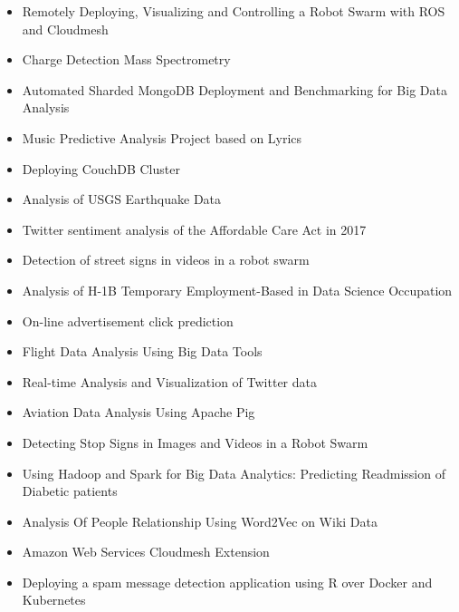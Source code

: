 \documentclass[sigconf]{acmart}
\begin{document}
\begin{itemize}

\item Remotely Deploying, Visualizing and Controlling a Robot Swarm with ROS
and Cloudmesh 

\item Charge Detection Mass Spectrometry

\item Automated Sharded MongoDB Deployment and Benchmarking for Big Data Analysis

\item Music Predictive Analysis Project based on Lyrics

\item Deploying CouchDB Cluster

\item Analysis of USGS Earthquake Data

\item Twitter sentiment analysis of the Affordable Care Act in 2017

\item Detection of street signs in videos in a robot swarm 

\item Analysis of H-1B Temporary Employment-Based in Data Science Occupation

\item On-line advertisement click prediction

\item Flight Data Analysis Using Big Data Tools

\item Real-time Analysis and Visualization of Twitter data

\item Aviation Data Analysis Using Apache Pig

\item Detecting Stop Signs in Images and Videos in a Robot Swarm

\item Using Hadoop and Spark for Big Data Analytics: Predicting Readmission of Diabetic patients

\item Analysis Of People Relationship Using Word2Vec on Wiki Data

\item Amazon Web Services Cloudmesh Extension

\item Deploying a spam message detection application using R over Docker and Kubernetes


\end{itemize}
\end{document}
